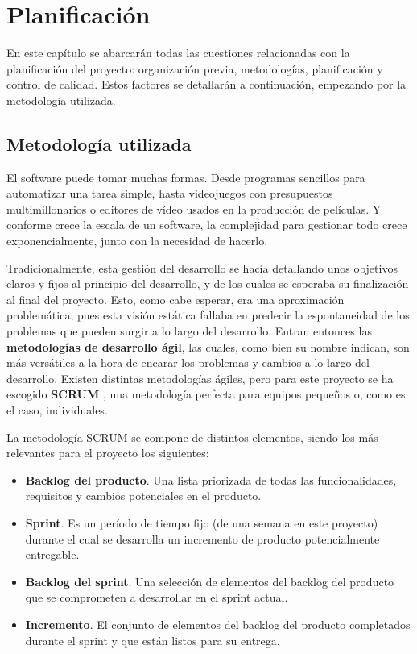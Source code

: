 \chapter{Planificación}

En este capítulo se abarcarán todas las cuestiones relacionadas con la planificación del proyecto: organización previa, metodologías, planificación y control de calidad. Estos factores se detallarán a continuación, empezando por la metodología utilizada.

\section{Metodología utilizada}

El software puede tomar muchas formas. Desde programas sencillos para automatizar una tarea simple, hasta videojuegos con presupuestos multimillonarios o editores de vídeo usados en la producción de películas.  Y conforme crece la escala de un software, la complejidad para gestionar todo crece exponencialmente, junto con la necesidad de hacerlo.

Tradicionalmente, esta gestión del desarrollo se hacía detallando unos objetivos claros y fijos al principio del desarrollo, y de los cuales se esperaba su finalización al final del proyecto. Esto, como cabe esperar, era una aproximación problemática, pues esta visión estática fallaba en predecir la espontaneidad de los problemas que pueden surgir a lo largo del desarrollo. Entran entonces las \textbf{metodologías de desarrollo ágil}, las cuales, como bien su nombre indican, son más versátiles a la hora de encarar los problemas y cambios a lo largo del desarrollo. Existen distintas metodologías ágiles, pero para este proyecto se ha escogido \textbf{SCRUM} \cite{scrum}, una metodología perfecta para equipos pequeños o, como es el caso, individuales.

La metodología SCRUM se compone de distintos elementos, siendo los más relevantes para el proyecto los siguientes:

\begin{itemize}
    \item \textbf{Backlog del producto}. Una lista priorizada de todas las funcionalidades, requisitos y cambios potenciales en el producto.
    \item \textbf{Sprint}. Es un período de tiempo fijo (de una semana en este proyecto) durante el cual se desarrolla un incremento de producto potencialmente entregable.
    \item \textbf{Backlog del sprint}. Una selección de elementos del backlog del producto que se comprometen a desarrollar en el sprint actual.
    \item \textbf{Incremento}. El conjunto de elementos del backlog del producto completados durante el sprint y que están listos para su entrega.
\end{itemize}

